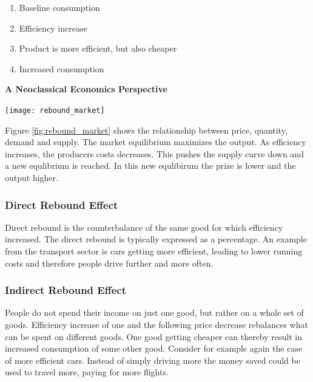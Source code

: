 \begin{enumerate}
    \item Baseline consumption
    \item Efficiency increase
    \item Product is more efficient, but also cheaper
    \item Increased consumption
\end{enumerate}

\begin{tcolorbox}
    \textbf{A Neoclassical Economics Perspective}\\

        \begin{center}
        \texttt{[image: rebound\_market]}
        \
        \label{fig:rebound_market}
        \end{center}

    Figure \ref{fig:rebound_market} shows the relationship between price, quantity, demand and supply.
    The market equilibrium maximizes the output.
    As efficiency increases, the producers costs decreases.
    This pushes the supply curve down and a new equlibrium is reached.
    In this new equlibirum the prize is lower and the output higher.
\end{tcolorbox}

\subsubsection{Direct Rebound Effect}
Direct rebound is the counterbalance of the same good for which efficiency increased.
The direct rebound is typically expressed as a percentage.
An example from the transport sector is cars getting more efficient, leading to lower running costs and therefore people drive further and more often.

\subsubsection{Indirect Rebound Effect}
People do not spend their income on just one good, but rather on a whole set of goods.
Efficiency increase of one and the following price decrease rebalances what can be spent on different goods.
One good getting cheaper can thereby result in increased consumption of some other good.
Consider for example again the case of more efficient cars.
Instead of simply driving more the money saved could be used to travel more, paying for more flights.

